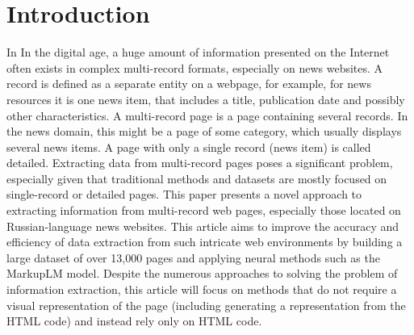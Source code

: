 \section{Introduction}
\ifx\ItIsIEEEDoc\undefined In \else In \fi the digital age, a huge amount of information presented on the Internet often exists in complex multi-record formats, especially on news websites. A record is defined as a separate entity on a webpage, for example, for news resources it is one news item, that includes a title, publication date and possibly other characteristics. A multi-record page is a page containing several records. In the news domain, this might be a page of some category, which usually displays several news items. A page with only a single record (news item) is called detailed. Extracting data from multi-record pages poses a significant problem, especially given that traditional methods and datasets are mostly focused on single-record or detailed pages. This paper presents a novel approach to extracting information from multi-record web pages, especially those located on Russian-language news websites. This article aims to improve the accuracy and efficiency of data extraction from such intricate web environments by building a large dataset of over 13,000 pages and applying neural methods such as the MarkupLM model. Despite the numerous approaches to solving the problem of information extraction, this article will focus on methods that do not require a visual representation of the page (including generating a representation from the HTML code) and instead rely only on HTML code.